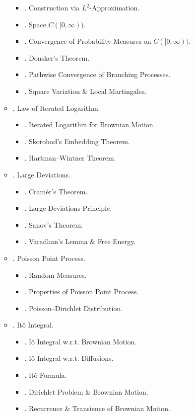 \documentclass{article}
\begin{document}
\begin{enumerate}
\begin{itemize}
\begin{itemize}
			\item {. Construction via $L^2$-Approximation.}
			\item {. Space $C([0,\infty))$.}
			\item {. Convergence of Probability Measures on $C([0,\infty))$.}
			\item {. Donsker's Theorem.}
			\item {. Pathwise Convergence of Branching Processes.}
			\item {. Square Variation \& Local Martingales.}
		\end{itemize}
		\item {. Law of Iterated Logarithm.}
		\begin{itemize}
			\item {. Iterated Logarithm for Brownian Motion.}
			\item {. Skorohod's Embedding Theorem.}
			\item {. Hartman--Wintner Theorem.}
		\end{itemize}
		\item {. Large Deviations.}
		\begin{itemize}
			\item {. Cram\'er's Theorem.}
			\item {. Large Deviations Principle.}
			\item {. Sanov's Theorem.}
			\item {. Varadhan's Lemma \& Free Energy.}
		\end{itemize}
		\item {. Poisson Point Process.}
		\begin{itemize}
			\item {. Random Measures.}
			\item {. Properties of Poisson Point Process.}
			\item {. Poisson--Dirichlet Distribution.}
		\end{itemize}
		\item {. It\^o Integral.}
		\begin{itemize}
			\item {. I\^o Integral w.r.t. Brownian Motion.}
			\item {. I\^o Integral w.r.t. Diffusions.}
			\item {. It\^o Formula.}
			\item {. Dirichlet Problem \& Brownian Motion.}
			\item {. Recurrence \& Transience of Brownian Motion.}

\end{itemize}
\end{itemize}
\end{enumerate}
\end{document}
